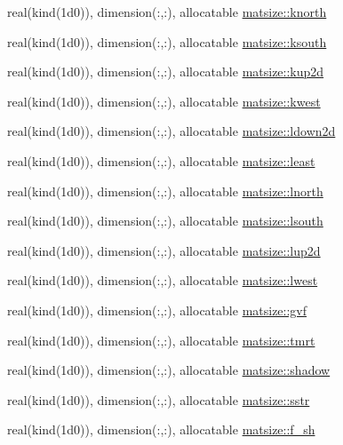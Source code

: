 \begin{DoxyCompactItemize}
\item 
real(kind(1d0)), dimension(\+:,\+:), allocatable \hyperlink{namespacematsize_aeee3798c5f6672da6ea25aa8787b4ab4}{matsize\+::knorth}
\item 
real(kind(1d0)), dimension(\+:,\+:), allocatable \hyperlink{namespacematsize_ad03d6ca2c8d26a947785c9dc94aa61db}{matsize\+::ksouth}
\item 
real(kind(1d0)), dimension(\+:,\+:), allocatable \hyperlink{namespacematsize_a6f666c13da51f22100a0043f53e724ca}{matsize\+::kup2d}
\item 
real(kind(1d0)), dimension(\+:,\+:), allocatable \hyperlink{namespacematsize_ac52a8cfa3a58b4aff078294cbdb70ed5}{matsize\+::kwest}
\item 
real(kind(1d0)), dimension(\+:,\+:), allocatable \hyperlink{namespacematsize_aaf966c70b77fe5646eb3ca89701232e8}{matsize\+::ldown2d}
\item 
real(kind(1d0)), dimension(\+:,\+:), allocatable \hyperlink{namespacematsize_aa87a43379aac21f08eec99b01c93823a}{matsize\+::least}
\item 
real(kind(1d0)), dimension(\+:,\+:), allocatable \hyperlink{namespacematsize_a5adfcfca2aa462e55a6ed15deb4c0138}{matsize\+::lnorth}
\item 
real(kind(1d0)), dimension(\+:,\+:), allocatable \hyperlink{namespacematsize_aa28ab3bf60483b5f18b3785b75b8f859}{matsize\+::lsouth}
\item 
real(kind(1d0)), dimension(\+:,\+:), allocatable \hyperlink{namespacematsize_a3337225f5c7bd795ed48fc7811611a59}{matsize\+::lup2d}
\item 
real(kind(1d0)), dimension(\+:,\+:), allocatable \hyperlink{namespacematsize_a8fe9b02501cb74972025943f45f742b1}{matsize\+::lwest}
\item 
real(kind(1d0)), dimension(\+:,\+:), allocatable \hyperlink{namespacematsize_a30597ac2227214d3724f34f551f3c904}{matsize\+::gvf}
\item 
real(kind(1d0)), dimension(\+:,\+:), allocatable \hyperlink{namespacematsize_a9154a4703b2d439f695e33201e46f231}{matsize\+::tmrt}
\item 
real(kind(1d0)), dimension(\+:,\+:), allocatable \hyperlink{namespacematsize_a3d9d89d00fce455db2334993b50c5e74}{matsize\+::shadow}
\item 
real(kind(1d0)), dimension(\+:,\+:), allocatable \hyperlink{namespacematsize_acd84773bbc050ab317186fe55d403afe}{matsize\+::sstr}
\item 
real(kind(1d0)), dimension(\+:,\+:), allocatable \hyperlink{namespacematsize_a6ab950e24bfe92c823016e8ed6e52873}{matsize\+::f\+\_\+sh}

\end{DoxyCompactItemize}
